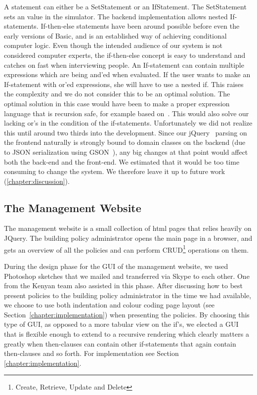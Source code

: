A statement can either be a SetStatement or an IfStatement. The SetStatement sets an value in the simulator. The backend implementation allows nested If-statements. If-then-else statements have been around possible before even the early versions of Basic, and is an established way of achieving conditional computer logic. Even though the intended audience of our system is not considered computer experts, the if-then-else concept is easy to understand and catches on fast when interviewing people. An If-statement can contain multiple expressions which are being and'ed when evaluated. If the user wants to make an If-statement with or'ed expressions, she will have to use a nested if. This raises the complexity and we do not consider this to be an optimal solution. The optimal solution in this case would have been to make a proper expression language that is recursion safe, for example based on~\cite{left-recursion}. This would also solve our lacking or's in the condition of the if-statements. Unfortunately we did not realize this until around two thirds into the development. Since our jQuery~\cite{jquery} parsing on the frontend naturally is strongly bound to domain classes on the backend (due to JSON serialization using GSON~\cite{gson}), any big changes at that point would affect both the back-end and the front-end. We estimated that it would be too time consuming to change the system. We therefore leave it up to future work (\ref{chapter:discussion}).

\subsection{The Management Website}
The management website is a small collection of html pages that relies heavily on JQuery. The building policy administrator opens the main page in a browser, and gets an overview of all the policies and can perform CRUD\footnote{Create, Retrieve, Update and Delete} operations on them.

During the design phase for the GUI of the management website, we used Photoshop sketches that we mailed and transferred via Skype to each other. One from the Kenyan team also assisted in this phase. After discussing how to best present policies to the building policy administrator in the time we had available, we choose to use both indentation and colour coding page layout (see Section~\ref{chapter:implementation}) when presenting the policies. By choosing this type of GUI, as opposed to a more tabular view on the if's, we elected a GUI that is flexible enough to extend to a recursive rendering which clearly matters a greatly when then-clauses can contain other if-statements that again contain then-clauses and so forth. For implementation see Section \ref{chapter:implementation}.

